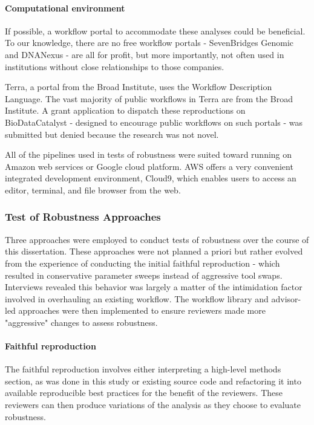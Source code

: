 \documentclass{drexelthesis}
\begin{document}
\paragraph{Computational environment}

If possible, a workflow portal to accommodate these analyses could be beneficial. To our knowledge, there are no free workflow portals - SevenBridges Genomic and DNANexus - are all for profit, but more importantly, not often used in institutions without close relationships to those companies.

Terra, a portal from the Broad Institute, uses the Workflow Description Language. The vast majority of public workflows in Terra are from the Broad Institute. A grant application to dispatch these reproductions on BioDataCatalyst - designed to encourage public workflows on such portals - was submitted but denied because the research was not novel.

All of the pipelines used in tests of robustness were suited toward running on Amazon web services or Google cloud platform. AWS offers a very convenient integrated development environment, Cloud9, which enables users to access an editor, terminal, and file browser from the web.

\subsubsection{Test of Robustness Approaches}

Three approaches were employed to conduct tests of robustness over the course of this dissertation. These approaches were not planned a priori but rather evolved from the experience of conducting the initial faithful reproduction - which resulted in conservative parameter sweeps instead of aggressive tool swaps. Interviews revealed this behavior was largely a matter of the intimidation factor involved in overhauling an existing workflow. The workflow library and advisor-led approaches were then implemented to ensure reviewers made more "aggressive" changes to assess robustness.

\paragraph{Faithful reproduction}

The faithful reproduction involves either interpreting a high-level methods section, as was done in this study or existing source code and refactoring it into available reproducible best practices for the benefit of the reviewers. These reviewers can then produce variations of the analysis as they choose to evaluate robustness.
\end{document}

